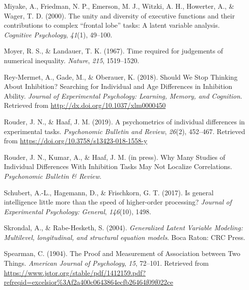 \documentclass[
  ,man]{apa6}
\newlength{\cslhangindent}
\newlength{\cslentryspacingunit} %
\newenvironment{CSLReferences}[2] %
 {%
  \setlength{\parindent}{0pt}
  \ifodd #1
  \let\oldpar\par
  \def\par{\hangindent=\cslhangindent\oldpar}
  \fi
  \setlength{\parskip}{#2\cslentryspacingunit}
 }%
 {}
\begin{document}
\begin{CSLReferences}{1}{0}
\leavevmode{}%
Miyake, A., Friedman, N. P., Emerson, M. J., Witzki, A. H., Howerter, A., \& Wager, T. D. (2000). The unity and diversity of executive functions and their contributions to complex {``frontal lobe''} tasks: {A} latent variable analysis. \emph{Cognitive Psychology}, \emph{41}(1), 49--100.

\leavevmode{}%
Moyer, R. S., \& Landauer, T. K. (1967). Time required for judgements of numerical inequality. \emph{Nature}, \emph{215}, 1519--1520.

\leavevmode{}%
Rey-Mermet, A., Gade, M., \& Oberauer, K. (2018). Should {We Stop Thinking About Inhibition}? {Searching} for {Individual} and {Age Differences} in {Inhibition Ability}. \emph{Journal of Experimental Psychology: Learning, Memory, and Cognition}. Retrieved from \url{http://dx.doi.org/10.1037/xlm0000450}

\leavevmode{}%
Rouder, J. N., \& Haaf, J. M. (2019). A psychometrics of individual differences in experimental tasks. \emph{Psychonomic Bulletin and Review}, \emph{26}(2), 452--467. Retrieved from \url{https://doi.org/10.3758/s13423-018-1558-y}

\leavevmode{}%
Rouder, J. N., Kumar, A., \& Haaf, J. M. (in press). Why {Many Studies} of {Individual Differences With Inhibition Tasks May Not Localize Correlations}. \emph{Psychonomic Bulletin \& Review}.

\leavevmode{}%
Schubert, A.-L., Hagemann, D., \& Frischkorn, G. T. (2017). Is general intelligence little more than the speed of higher-order processing? \emph{Journal of Experimental Psychology: General}, \emph{146}(10), 1498.

\leavevmode{}%
Skrondal, A., \& Rabe-Hesketh, S. (2004). \emph{Generalized {Latent Variable Modeling}: Multilevel, longitudinal, and structural equation models}. {Boca Raton}: {CRC Press}.

\leavevmode{}%
Spearman, C. (1904). The {Proof} and {Measurement} of {Association} between {Two Things}. \emph{American Journal of Psychology}, \emph{15}, 72--101. Retrieved from \url{https://www.jstor.org/stable/pdf/1412159.pdf?refreqid=excelsior\%3Af2a400c0643864ecfb26464f09f022ce}


\end{CSLReferences}
\end{document}
